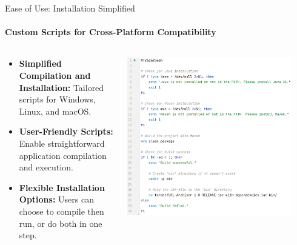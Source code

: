 \documentclass[
ngerman,%
authorontitle=true,
]{bfhbeamer}
\begin{document}
	\begin{frame}{Ease of Use: Installation Simplified}
		\framesubtitle{Custom Scripts for Cross-Platform Compatibility}
		\begin{columns} %
			\begin{column}{0.5\textwidth} %
				\begin{itemize}
					\item \textbf{Simplified Compilation and Installation:} Tailored scripts for Windows, Linux, and macOS.
					\item \textbf{User-Friendly Scripts:} Enable straightforward application compilation and execution.
					\item \textbf{Flexible Installation Options:} Users can choose to compile then run, or do both in one step.
				\end{itemize}
			\end{column}
			\begin{column}{0.5\textwidth} %
				\begin{center}
					\includegraphics[width=0.9\textwidth]{pictures/final_presentation/build_script.png}
				\end{center}
			\end{column}
		\end{columns} %
	\end{frame}
	
\end{document}
